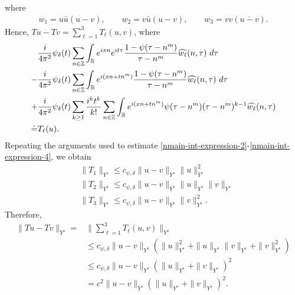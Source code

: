 %
where
%
\begin{equation*}
	\begin{split}
		w_1 = u \bar u \left( u -v \right), \qquad w_2 = v \bar u \left( u -v 
		\right), \qquad w_3 = v v \left( \overline{u -v} \right).
	\end{split}
\end{equation*}
%
Hence, $Tu - Tv = \sum_{\ell=1}^{3} 
T_\ell(u, v)$, where
\begin{align}
	\label{nmain-int-exp-mod1}
	& \frac{i}{4 \pi^2} \psi_{\delta}(t) \sum_{n\in \mathbb{Z}} \int_{\mathbb{R}} e^{ixn}  
		e^{it \tau} \frac{ 1 - \psi(\tau - n^{m}) 
		}{\tau - n^{m}} \widehat{w_\ell}(n, \tau) \ d \tau
		\\
		\label{nmain-int-exp-mod2}
		- & \frac{i}{4 \pi^2} \psi_{\delta}(t) \sum_{n\in \mathbb{Z}} \int_{\mathbb{R}} e^{i(xn + 
		tn^{m})}
		 \frac{1- \psi(\tau - n^{m})}{\tau - n^{m}} \widehat{w_\ell}(n, \tau) \ d \tau
		\\
		\label{nmain-int-exp-mod3}
		+ & \frac{i}{4 \pi^2} \psi_{\delta}(t) \sum_{k \ge 1} \frac{i^k t^k}{k!}
		\sum_{n \in \mathbb{Z}} \int_{\mathbb{R}} e^{i(xn + tn^{m} )}
		\psi(\tau - n^{m}) (\tau - n^{m})^{k-1} \widehat{w_\ell}(n, \tau)  
		\\
		\doteq & T_\ell(u). \notag
\end{align}
Repeating the arguments used to estimate 
\eqref{nmain-int-expression-2}-\eqref{nmain-int-expression-4}, we obtain
%
\begin{equation*}
	\begin{split}
    & \|T_1\|_{Y^s} \le c_{\psi,\delta} \|u -v \|_{Y^s} \|u\|^2_{Y^s}
		\\
    & \|T_2\|_{Y^s} \le c_{\psi,\delta} \|u -v \|_{Y^s} \|u\|_{Y^s} \|v\|_{Y^s}
		\\
    & \|T_3\|_{Y^s} \le c_{\psi,\delta} \|u -v \|_{Y^s} \|v\|_{Y^s}^2.
	\end{split}
\end{equation*}
%
Therefore,
%
\begin{equation}
	\label{n20a}
	\begin{split}
    \|Tu - Tv \|_{Y^s} = & \| \sum_{\ell =1}^{3} T_\ell(u, v) \|_{Y^s}
		\\
    & \le c_{\psi,\delta} \|u -v \|_{Y^s} \left( \|u\|_{Y^s}^2 + 
		\|u\|_{Y^s} \|v\|_{Y^s} + \|v\|_{Y^s}^2 \right)
		\\
		& \le c_{\psi,\delta} \|u -v\|_{Y^s} \left( \|u\|_{Y^s} + \|v\|_{Y^s} \right)^2
		\\
		& = c^2 \|u -v\|_{Y^s} \left( \|u\|_{Y^s} + \|v\|_{Y^s} \right)^2.
	\end{split}
\end{equation}
